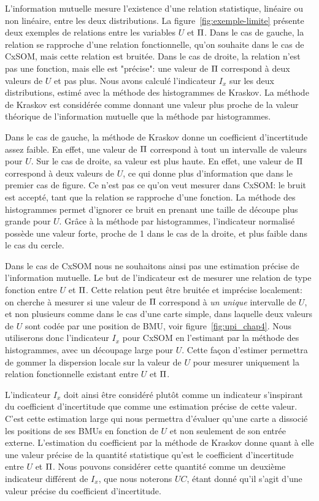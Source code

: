 \documentclass[../main]{subfiles}
\begin{document}
L'information mutuelle mesure l'existence d'une relation statistique, linéaire ou non linéaire, entre les deux distributions. La figure~\ref{fig:exemple-limite} présente deux exemples de relations entre les variables $U$ et $\Pi$.
Dans le cas de gauche, la relation se rapproche d'une relation fonctionnelle, qu'on souhaite dans le cas de CxSOM, mais cette relation est bruitée. Dans le cas de droite, la relation n'est pas une fonction, mais elle est "précise": une valeur de $\Pi$ correspond à deux valeurs de $U$ et pas plus.
Nous avons calculé l'indicateur $I_x$ sur les deux distributions, estimé avec la méthode des histogrammes de Kraskov. La méthode de Kraskov est considérée comme donnant une valeur plus proche de la valeur théorique de l'information mutuelle que la méthode par histogrammes. 

Dans le cas de gauche, la méthode de Kraskov donne un coefficient d'incertitude assez faible. En effet, une valeur de $\Pi$ correspond à tout un intervalle de valeurs pour $U$. Sur le cas de droite, sa valeur est plus haute. En effet, une valeur de $\Pi$ correspond à deux valeurs de $U$, ce qui donne plus d'information que dans le premier cas de figure. Ce n'est pas ce qu'on veut mesurer dans CxSOM: le bruit est accepté, tant que la relation se rapproche d'une fonction.
La méthode des histogrammes permet d'ignorer ce bruit en prenant une taille de découpe plus grande pour $U$. Grâce à la méthode par histogrammes, l'indicateur normalisé possède une valeur forte, proche de 1 dans le cas de la droite, et plus faible dans le cas du cercle.

Dans le cas de CxSOM nous ne souhaitons ainsi pas une estimation précise de l'information mutuelle.
Le but de l'indicateur est de mesurer une relation de type fonction entre $U$ et $\Pi$.
Cette relation peut être bruitée et imprécise localement: on cherche à mesurer si une valeur de $\Pi$ correspond à \emph{un unique} intervalle de $U$, et non plusieurs comme dans le cas d'une carte simple, dans laquelle deux valeurs de $U$ sont codée par une position de BMU, voir figure~\ref{fig:upi_chap4}.
Nous utiliserons donc l'indicateur $I_x$ pour CxSOM en l'estimant par la méthode des histogrammes, avec un découpage large pour $U$. Cette façon d'estimer permettra de gommer la dispersion locale sur la valeur de $U$ pour mesurer uniquement la relation fonctionnelle existant entre $U$ et $\Pi$.

L'indicateur $I_x$ doit ainsi être considéré plutôt comme un indicateur s'inspirant du coefficient d'incertitude que comme une estimation précise de cette valeur. 
C'est cette estimation large qui nous permettra d'évaluer qu'une carte a dissocié les positions de ses BMUs en fonction de $U$ et non seulement de son entrée externe.
L'estimation du coefficient par la méthode de Kraskov donne quant à elle une valeur précise de la quantité statistique qu'est le coefficient d'incertitude entre $U$ et $\Pi$.
Nous pouvons considérer cette quantité comme un deuxième indicateur différent de $I_x$, que nous noterons $UC$, étant donné qu'il s'agit d'une valeur précise du coefficient d'incertitude. 
\end{document}

